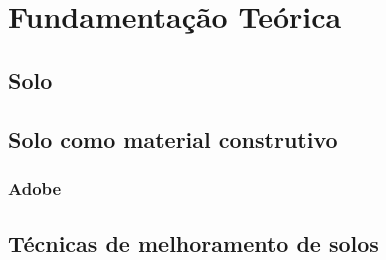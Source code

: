 \newpage

\section[FUNDAMENTAÇÃO TEÓRICA]{Fundamentação Teórica}

\subsection{Solo}


\subsection{Solo como material construtivo}


\subsubsection{Adobe}


\subsection{Técnicas de melhoramento de solos}


